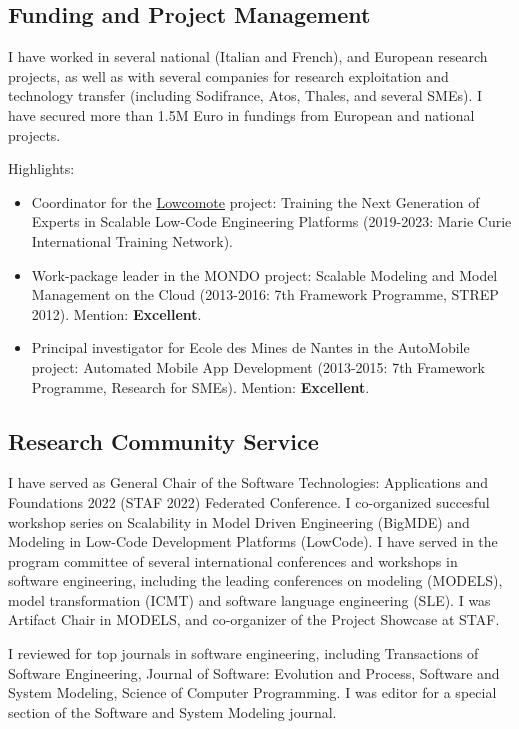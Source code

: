 \subsection{Funding and Project Management}
I have worked in several national (Italian and French), and European research projects, as well as with several companies for research exploitation and technology transfer (including Sodifrance, Atos, Thales, and several SMEs). I have secured more than 1.5M Euro in fundings from European and national projects.

\medskip
Highlights:
 \begin{itemize}
 \item Coordinator for the \href{https://www.lowcomote.eu/}{Lowcomote} project: Training the Next Generation of Experts in Scalable Low-Code Engineering Platforms (2019-2023: Marie Curie International Training Network).
 \item Work-package leader in the MONDO project: Scalable Modeling and Model Management on the Cloud (2013-2016: 7th Framework Programme, STREP 2012). Mention: \textbf{Excellent}.
 \item Principal investigator for Ecole des Mines de Nantes in the AutoMobile project: Automated Mobile App Development (2013-2015: 7th Framework Programme, Research for SMEs). Mention: \textbf{Excellent}.
\end{itemize}

\subsection{Research Community Service}

I have served as General Chair of the Software Technologies: Applications and Foundations 2022 (STAF 2022) Federated Conference. I co-organized succesful workshop series on Scalability in Model Driven Engineering (BigMDE) and Modeling in Low-Code Development Platforms (LowCode). 
I have served in the program committee of several international conferences and workshops in software engineering, including the leading conferences on modeling (MODELS), model transformation (ICMT) and software language engineering (SLE). I was Artifact Chair in MODELS, and co-organizer of the Project Showcase at STAF.

I reviewed for top journals in software engineering, including Transactions of Software Engineering, Journal of Software: Evolution and Process, Software and System Modeling, Science of Computer Programming. I was editor for a special section of the Software and System Modeling journal.

